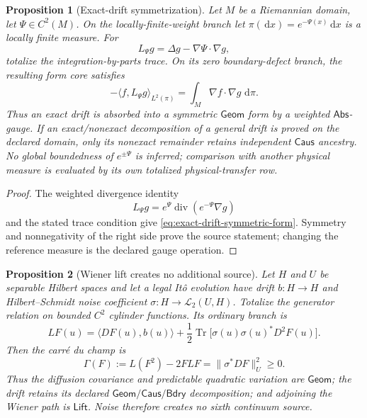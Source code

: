 \documentclass[11pt]{article}
\numberwithin{section}{part}
\theoremstyle{plain}
\newtheorem{proposition}[proposition]{Proposition}
\theoremstyle{definition}
\theoremstyle{remark}
\newcommand{\dd}{\,\mathrm d}
\newcommand{\Geom}{\mathsf{Geom}}
\newcommand{\Caus}{\mathsf{Caus}}
\newcommand{\Abs}{\mathsf{Abs}}
\newcommand{\Lift}{\mathsf{Lift}}
\newcommand{\Bdry}{\mathsf{Bdry}}
\begin{document}
\begin{proposition}[Exact-drift symmetrization]
\label{prop:exact-drift-symmetrization}
Let \(M\) be a Riemannian domain, let
\(\Psi\in C^2(M)\).  On the locally-finite-weight branch let
\(\pi(\dd x)=e^{-\Psi(x)}\dd x\) is a locally finite measure.
For
\[
 L_\Psi g=\Delta g-\nabla\Psi\cdot\nabla g,
\]
totalize the integration-by-parts trace.  On its zero boundary-defect branch,
the resulting form core satisfies
\begin{equation}
 \label{eq:exact-drift-symmetric-form}
 -\langle f,L_\Psi g\rangle_{L^2(\pi)}
 =\int_M\nabla f\cdot\nabla g\,\dd\pi.
\end{equation}
Thus an exact drift is absorbed into a symmetric \(\Geom\) form by a weighted
\(\Abs\)-gauge.  If an exact/nonexact decomposition of a general drift is
proved on the declared domain, only its nonexact remainder retains independent
\(\Caus\) ancestry.  No global boundedness of \(e^{\pm\Psi}\) is inferred;
comparison with another physical measure is evaluated by its own totalized
physical-transfer row.
\end{proposition}

\begin{proof}
The weighted divergence identity
\[
 L_\Psi g=e^\Psi\operatorname{div}(e^{-\Psi}\nabla g)
\]
and the stated trace condition give
\eqref{eq:exact-drift-symmetric-form}.  Symmetry and nonnegativity of the
right side prove the source statement; changing the reference measure is the
declared gauge operation.
\end{proof}

\begin{proposition}[Wiener lift creates no additional source]
\label{prop:wiener-lift-source-routing}
Let \(H\) and \(U\) be separable Hilbert spaces and let a legal It\^o
evolution have drift \(b:H\to H\) and Hilbert--Schmidt noise coefficient
\(\sigma:H\to\mathcal L_2(U,H)\).  Totalize the generator relation on bounded
\(C^2\) cylinder functions.  Its ordinary branch is
\begin{equation}
 \label{eq:ito-generator-source-split}
 LF(u)=\langle DF(u),b(u)\rangle
 +\frac12\operatorname{Tr}
   \bigl[\sigma(u)\sigma(u)^*D^2F(u)\bigr].
\end{equation}
Then the carré du champ is
\begin{equation}
 \label{eq:ito-carre-du-champ}
 \Gamma(F)
 :=L(F^2)-2FLF
 =\|\sigma^*DF\|_U^2\ge0.
\end{equation}
Thus the diffusion covariance and predictable quadratic variation are
\(\Geom\); the drift retains its declared
\(\Geom/\Caus/\Bdry\) decomposition; and adjoining the Wiener path is
\(\Lift\).  Noise therefore creates no sixth continuum source.
\end{proposition}
\end{document}
